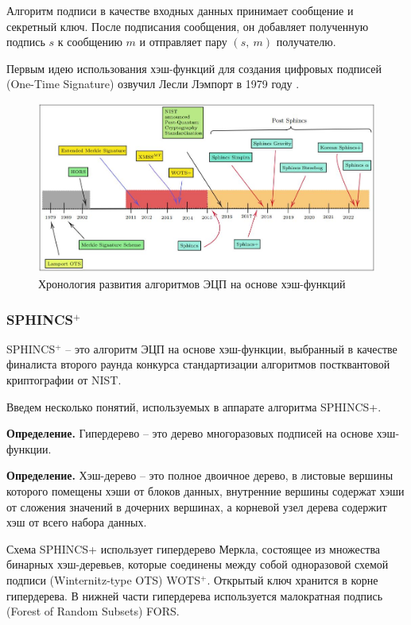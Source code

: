 Алгоритм подписи в качестве входных данных принимает сообщение и секретный ключ. После подписания сообщения, он добавляет полученную подпись $s$ к сообщению $m$ и отправляет пару $(s,\ m)$ получателю.

Первым идею использования хэш-функций для создания цифровых подписей (One-Time Signature) озвучил Лесли Лэмпорт в 1979 году \cite{lamport}.

\begin{figure}[h]
\centering
\includegraphics[scale=0.6]{images/timeline.jpg}
\caption{Хронология развития алгоритмов ЭЦП на основе хэш-функций \cite{timeline}}
\end{figure}

\subsubsection{SPHINCS$^+$}

SPHINCS$^+$ -- это алгоритм ЭЦП на основе хэш-функции, выбранный в качестве финалиста второго раунда конкурса стандартизации алгоритмов постквантовой криптографии от NIST. 

 Введем несколько понятий, используемых в аппарате алгоритма SPHINCS+.

\textbf{Определение.} Гипердерево -- это дерево многоразовых подписей на основе хэш-функции.

\textbf{Определение.} Хэш-дерево -- это полное двоичное дерево, в листовые вершины которого помещены хэши от блоков данных, внутренние вершины содержат хэши от сложения значений в дочерних вершинах, а корневой узел дерева содержит хэш от всего набора данных.


Схема SPHINCS+ использует гипердерево Меркла, состоящее из множества бинарных хэш-деревьев, которые соединены между собой одноразовой схемой подписи (Winternitz-type OTS) WOTS$^+$. Открытый ключ хранится в корне гипердерева. В нижней части гипердерева используется малократная подпись (Forest of Random Subsets) FORS.

